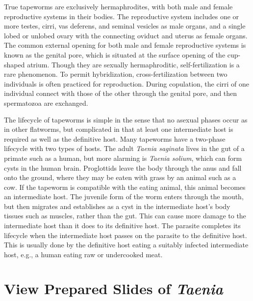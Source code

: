 True tapeworms are exclusively hermaphrodites, with both male and female
reproductive systems in their bodies. The reproductive system includes
one or more testes, cirri, vas deferens, and seminal vesicles as male
organs, and a single lobed or unlobed ovary with the connecting oviduct
and uterus as female organs. The common external opening for both male
and female reproductive systems is known as the genital pore, which is
situated at the surface opening of the cup-shaped atrium. Though they
are sexually hermaphroditic, self-fertilization is a rare phenomenon. To
permit hybridization, cross-fertilization between two individuals is
often practiced for reproduction. During copulation, the cirri of one
individual connect with those of the other through the genital pore, and
then spermatozoa are exchanged.

The lifecycle of tapeworms is simple in the sense that no asexual phases
occur as in other flatworms, but complicated in that at least one
intermediate host is required as well as the definitive host. Many
tapeworms have a two-phase lifecycle with two types of hosts. The adult
\emph{Taenia saginata} lives in the gut of a primate such as a human, but more
alarming is \emph{Taenia solium}, which can form cysts in the human brain.
Proglottids leave the body through the anus and fall onto the ground,
where they may be eaten with grass by an animal such as a cow. If the
tapeworm is compatible with the eating animal, this animal becomes an
intermediate host. The juvenile form of the worm enters through the
mouth, but then migrates and establishes as a cyst in the intermediate
host's body tissues such as muscles, rather than the gut. This can cause
more damage to the intermediate host than it does to its definitive
host. The parasite completes its lifecycle when the intermediate host
passes on the parasite to the definitive host. This is usually done by
the definitive host eating a suitably infected intermediate host, e.g.,
a human eating raw or undercooked meat.

\section{\texorpdfstring{View Prepared Slides of
\emph{Taenia}}{View Prepared Slides of Taenia}}\label{view-prepared-slides-of-taenia}

